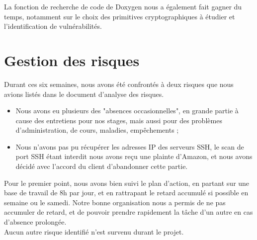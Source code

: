 La fonction de recherche de code de Doxygen nous a également fait gagner du temps, notamment sur le choix des primitives cryptographiques à étudier et l'identification de vulnérabilités.\\

\section{Gestion des risques}

Durant ces six semaines, nous avons été confrontés à deux risques que nous avions listés dans le document d'analyse des risques.
\begin{itemize}
\item Nous avons eu plusieurs des "absences occasionnelles", en grande partie à cause des entretiens pour nos stages, mais aussi pour des problèmes d'administration, de cours, maladies, empêchements ;
\item Nous n'avons pas pu récupérer les adresses IP des serveurs SSH, le scan de port SSH étant interdit nous avons reçu une plainte d'Amazon, et nous avons décidé avec l'accord du client d'abandonner cette partie.\\
\end{itemize}

Pour le premier point, nous avons bien suivi le plan d'action, en partant sur une base de travail de 8h par jour, et en rattrapant le retard accumulé si possible en semaine ou le samedi. Notre bonne organisation nous a permis de ne pas accumuler de retard, et de pouvoir prendre rapidement la tâche d'un autre en cas d'absence prolongée.\\

Aucun autre risque identifié n'est survenu durant le projet.

